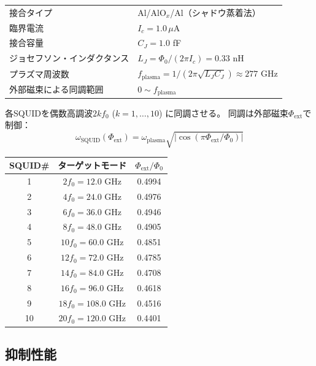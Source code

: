 \documentclass[12pt,a4paper]{article}
\begin{document}
\begin{specbox}[SQUID仕様]
\begin{tabular}{ll}
接合タイプ & Al/AlO$_x$/Al（シャドウ蒸着法） \\
臨界電流 & $I_c = 1.0\,\mu$A \\
接合容量 & $C_J = 1.0$ fF \\
ジョセフソン・インダクタンス & $L_J = \Phi_0/(2\pi I_c) = 0.33$ nH \\
プラズマ周波数 & $f_{\mathrm{plasma}} = 1/(2\pi\sqrt{L_J C_J}) \approx 277$ GHz \\
外部磁束による同調範囲 & $0 \sim f_{\mathrm{plasma}}$ \\
\end{tabular}
\end{specbox}

各SQUIDを偶数高調波$2kf_0$ ($k = 1, \ldots, 10$) に同調させる。
同調は外部磁束$\Phi_{\mathrm{ext}}$で制御：
\begin{equation}
  \omega_{\mathrm{SQUID}}(\Phi_{\mathrm{ext}}) =
  \omega_{\mathrm{plasma}} \sqrt{|\cos(\pi\Phi_{\mathrm{ext}}/\Phi_0)|}
\end{equation}

\begin{specbox}[SQUID同調パラメータ]
\begin{tabular}{ccc}
\toprule
SQUID\# & ターゲットモード & $\Phi_{\mathrm{ext}}/\Phi_0$ \\
\midrule
1 & $2f_0 = 12.0$ GHz & 0.4994 \\
2 & $4f_0 = 24.0$ GHz & 0.4976 \\
3 & $6f_0 = 36.0$ GHz & 0.4946 \\
4 & $8f_0 = 48.0$ GHz & 0.4905 \\
5 & $10f_0 = 60.0$ GHz & 0.4851 \\
6 & $12f_0 = 72.0$ GHz & 0.4785 \\
7 & $14f_0 = 84.0$ GHz & 0.4708 \\
8 & $16f_0 = 96.0$ GHz & 0.4618 \\
9 & $18f_0 = 108.0$ GHz & 0.4516 \\
10 & $20f_0 = 120.0$ GHz & 0.4401 \\
\bottomrule
\end{tabular}
\end{specbox}

\subsection{抑制性能}
\end{document}
